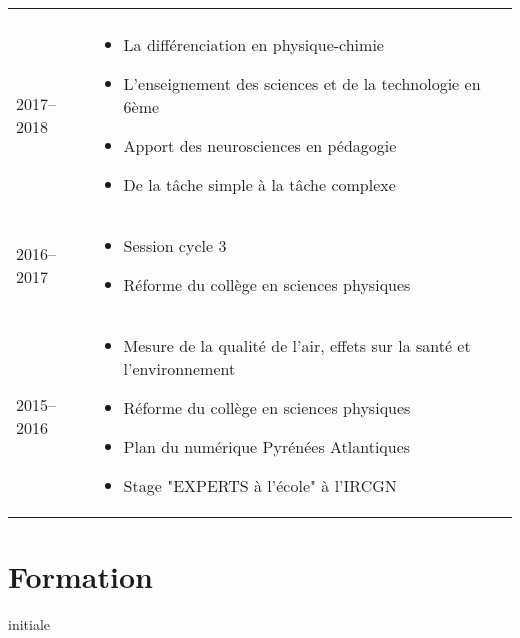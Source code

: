 \documentclass{cv-style-cec}
\begin{document}
\begin{longtable}{lp{12cm}}
\begin{itemize}
        \end{itemize}\vspace{-4pt}\\
    2017--2018 & %
        \vspace{-8pt}
        \begin{itemize}
            \item La différenciation en physique-chimie
            \item L'enseignement des sciences et de la technologie en 6ème
            \item Apport des neurosciences en pédagogie
            \item De la tâche simple à la tâche complexe
        \end{itemize} \vspace{-4pt} \\
    2016--2017 & %
        \vspace{-8pt}
        \begin{itemize}
            \item Session cycle 3
            \item Réforme du collège en sciences physiques
        \end{itemize} \vspace{-4pt} \\
    2015--2016 & %
        \vspace{-8pt}
        \begin{itemize}
            \item Mesure de la qualité de l'air, effets sur la santé et l'environnement
            \item Réforme du collège en sciences physiques
            \item Plan du numérique Pyrénées Atlantiques
            \item Stage "EXPERTS à l'école" à l'IRCGN
        \end{itemize} \\
\end{longtable}


\vspace{-2ex}
\section{Formation}{ initiale}
\end{document}
